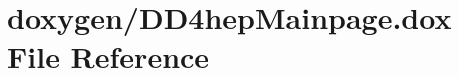 \hypertarget{_d_d4hep_mainpage_8dox}{
\section{doxygen/DD4hepMainpage.dox File Reference}
\label{_d_d4hep_mainpage_8dox}
}
